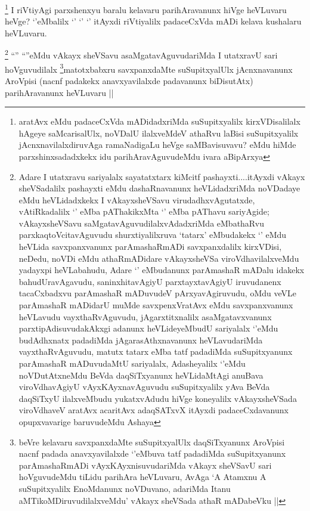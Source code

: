 
\begin{artha}
\footnote{aratAvx eMdu padaceCxVda mADidadxriMda suSupitxyalilx kirxVDisalilalx hAgeye saMcarisalUlx, noVDalU ilalxveMdeV athaRvu laBisi suSupitxyalilx jAcnxnavilalxdiruvAga ramaNadigaLu heVge saMBavisuvavu? eMdu hiMde parxshinxsadadxkekx idu parihAravAguvudeMdu ivara aBipArxya}
I riVtiyAgi parxshenxyu baralu kelavaru parihAravanunx hiVge heVLuvaru heVge? `\stext'eMbalilx `\stext' `\stext' `\stext' itAyxdi riVtiyalilx padaceCxVda mADi kelava kushalaru heVLuvaru.
\end{artha}

 
\begin{artha}
\footnote{Adare I utatxravu sariyalalx sayatatxtarx kiMcitf pashayxti....itAyxdi vAkayx sheVSadalilx pashayxti eMdu dashaRnavanunx heVLidadxriMda noVDadaye eMdu heVLidadxkekx I vAkayxsheVSavu virudadhxvAgutatxde, vAtiRkadalilx `\stext' eMba pAThakikxMta `\stext' eMba pAThavu sariyAgide; vAkayxsheVSavu saMgatavAguvudilalxvAdadxriMda eMbathaRvu parxkaqtoVcitavAguvudu shurxtiyalilxruva `tatarx' eMbudakekx `\stext' eMdu heVLida savxpanxvanunx parAmashaRmADi savxpanxdalilx kirxVDisi, neDedu, noVDi eMdu athaRmADidare vAkayxsheVSa viroVdhavilalxveMdu yadayxpi heVLabahudu, Adare `\stext' eMbudanunx parAmashaR mADalu idakekx bahudUravAgavudu, saninxhitavAgiyU parxtayxtavAgiyU iruvudanenx tacaCxbadxvu parAmashaR mADuvudeV pArxyavAgiruvudu, oMdu veVLe parAmashaR mADidarU muMde savxpenxVratAvx eMdu savxpanxvanunx heVLavudu vayxthaRvAguvudu, jAgarxtitxnalilx asaMgatavxvanunx parxtipAdisuvudakAkxgi adanunx heVLideyeMbudU sariyalalx `\stext'eMdu budAdhxnatx padadiMda jAgarasAthxnavanunx heVLavudariMda vayxthaRvAguvudu, matutx tatarx eMba tatf padadiMda suSupitxyanunx parAmashaR mADuvudaMtU sariyalalx, Adasheyalilx `\stext'eMdu noVDutAtxneMdu BeVda daqSiTxyanunx heVLidaMtAgi anuBava viroVdhavAgiyU vAyxKAyxnavAguvudu suSupitxyalilx yAva BeVda daqSiTxyU ilalxveMbudu yukatxvAdudu hiVge koneyalilx vAkayxsheVSada viroVdhaveV aratAvx acaritAvx adaqSATxvX itAyxdi padaceCxdavanunx opupxvavarige baruvudeMdu Ashaya}
``\stext'' ``\stext''eMdu vAkayx sheVSavu asaMgatavAguvudariMda I utatxravU sari hoVguvudilalx \footnote{beVre kelavaru savxpanxdaMte suSupitxyalUlx daqSiTxyanunx AroVpisi nacnf padada anavxyavilalxde `\stext'eMbuva tatf padadiMda suSupitxyanunx parAmashaRmADi vAyxKAyxnisuvudariMda vAkayx sheVSavU sari hoVguvudeMdu tiLidu parihAra heVLuvaru, AvAga `A Atamxnu A suSupitxyalilx EnoMdanunx noVDuvano, adariMda Itanu aMTikoMDiruvudilalxveMdu' vAkayx sheVSada athaR mADabeVku ||}matotxbabxru savxpanxdaMte suSupitxyalUlx jAcnxnavanunx AroVpisi (nacnf padakekx anavxyavilalxde padavanunx biDisutAtx) parihAravanunx heVLuvaru ||
\end{artha}

